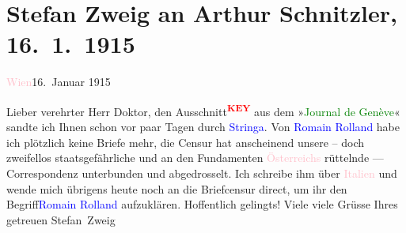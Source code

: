 

\renewcommand{\erwaehntePersonen}{Personen: Romain Rolland, Alberto Stringa, Stefan Zweig}
\renewcommand{\erwaehnteOrte}{Orte: Italien, Wien, Österreich}
\renewcommand{\erwaehnteWerke}{Werke: Journal de Genève}
\section[Stefan Zweig an Arthur Schnitzler, 16. 1. 1915]{Stefan Zweig an Arthur Schnitzler, 16. 1. 1915}
\nopagebreak{}
\rehead{ }\normalsize\beginnumbering{}
\toendnotes[C]{\smallbreak\pagebreak[2]}
\toendnotes[C]{\smallbreak}
\pstart
           {\pb}\textcolor{pink}{Wien}{}\ledrightnote{\textcolor{pink}{Wien}}{ }16. Januar
                  1915\pend
           
\pstart
           Lieber verehrter Herr Doktor, den Ausschnitt\textcolor{red}{\textsuperscript{\textbf{KEY}}} aus dem »\textcolor{green}{Journal de
                  Genève}{}\ledrightnote{\textcolor{green}{Journal de Genève}}« sandte ich Ihnen schon vor paar Tagen durch \textcolor{blue}{Stringa}{}\ledrightnote{\textcolor{blue}{Alberto Stringa}}. Von \textcolor{blue}{Romain
                  Rolland}{}\ledrightnote{\textcolor{blue}{Romain Rolland}} habe ich plötzlich keine Briefe mehr, die Censur hat anscheinend
               unsere – doch zweifellos staatsgefährliche und an den Fundamenten \textcolor{pink}{Österreichs}{}\ledrightnote{\textcolor{pink}{Österreich}} rüttelnde — Correspondenz unterbunden und
               abgedrosselt. Ich schreibe ihm über \textcolor{pink}{Italien}{}\ledrightnote{\textcolor{pink}{Italien}} und
               wende mich übrigens heute noch an die Briefcensur direct, um ihr den Begriff\textcolor{blue}{Romain Rolland}{}\ledrightnote{\textcolor{blue}{Romain Rolland}} aufzuklären. Hoffentlich
               ge­lingts! Viele viele Grüsse Ihres getreuen\pend
           \pstart \spacefill\mbox{Stefan Zweig}\pend{}\endnumbering{}
\begin{anhang}
\end{anhang}
      